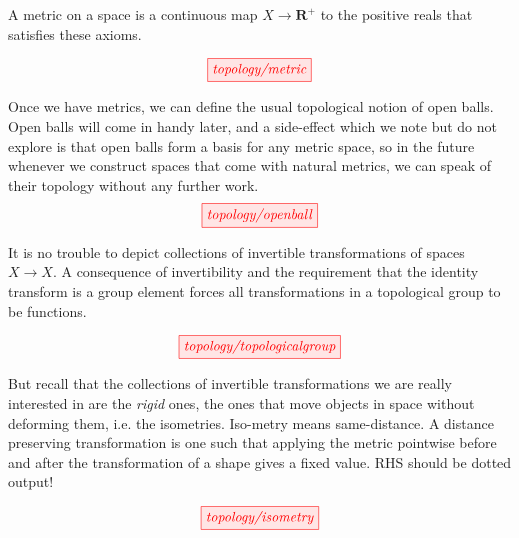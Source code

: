 \begin{myboxB}
\begin{defn}[Metric]\label{def:metric}
A metric on a space is a continuous map $X \rightarrow \mathbf{R}^+$ to the positive reals that satisfies these axioms.
\end{defn}
\[\tikzfig{topology/metric}\]
\end{myboxB}

\begin{myboxR}
\begin{defn}\label{def:openball}
Once we have metrics, we can define the usual topological notion of open balls. Open balls will come in handy later, and a side-effect which we note but do not explore is that open balls form a basis for any metric space, so in the future whenever we construct spaces that come with natural metrics, we can speak of their topology without any further work.
\[\tikzfig{topology/openball}\]
\end{defn}
\end{myboxR}

\begin{myboxB}
\begin{defn}\label{def:topgrp} 
It is no trouble to depict collections of invertible transformations of spaces $X \rightarrow X$. A consequence of invertibility and the requirement that the identity transform is a group element forces all transformations in a topological group to be functions.
\end{defn}
\[\tikzfig{topology/topologicalgroup}\]
\end{myboxB}

\begin{myboxR}
\begin{defn}[Isometry]\label{def:isometry}
But recall that the collections of invertible transformations we are really interested in are the \emph{rigid} ones, the ones that move objects in space without deforming them, i.e. the isometries. Iso-metry means same-distance. A distance preserving transformation is one such that applying the metric pointwise before and after the transformation of a shape gives a fixed value. \bR RHS should be dotted output! \e
\end{defn}
\[\tikzfig{topology/isometry}\]
\end{myboxR}


